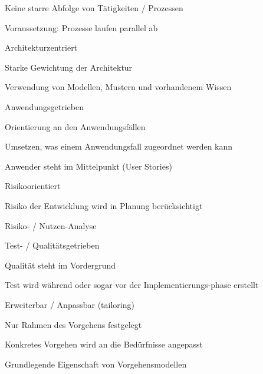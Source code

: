 \documentclass[a4paper]{article}
\begin{document}
\begin{multicols}{3}
\begin{itemize*}
\begin{itemize*}
\begin{itemize*}
                    \item Keine starre Abfolge von Tätigkeiten / Prozessen
                    \item Voraussetzung: Prozesse laufen parallel ab
                  \end{itemize*}
            \item Architekturzentriert
                  \begin{itemize*}
                    \item Starke Gewichtung der Architektur
                    \item Verwendung von Modellen, Mustern und vorhandenem Wissen
                  \end{itemize*}
            \item Anwendungsgetrieben
                  \begin{itemize*}
                    \item Orientierung an den Anwendungsfällen
                    \item Umsetzen, was einem Anwendungsfall zugeordnet werden kann
                    \item Anwender steht im Mittelpunkt (User Stories)
                  \end{itemize*}
            \item Risikoorientiert
                  \begin{itemize*}
                    \item Risiko der Entwicklung wird in Planung berücksichtigt
                    \item Risiko- / Nutzen-Analyse
                  \end{itemize*}
            \item Test- / Qualitätsgetrieben
                  \begin{itemize*}
                    \item Qualität steht im Vordergrund
                    \item Test wird während oder sogar vor der Implementierungs-phase erstellt
                  \end{itemize*}
            \item Erweiterbar / Anpassbar (tailoring)
                  \begin{itemize*}
                    \item Nur Rahmen des Vorgehens festgelegt
                    \item Konkretes Vorgehen wird an die Bedürfnisse angepasst
                    \item Grundlegende Eigenschaft von Vorgehensmodellen

\end{itemize*}
\end{itemize*}
\end{itemize*}
\end{multicols}
\end{document}
